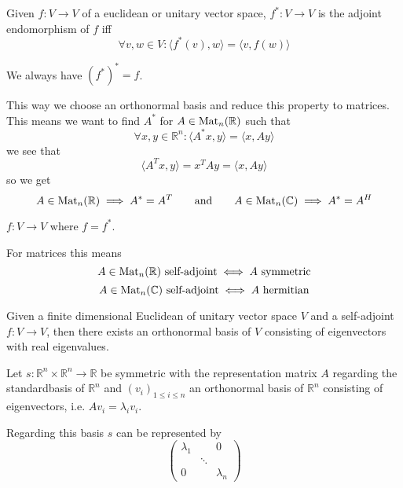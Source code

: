 \begin{definition}
   Given \(f: V \to V\) of a euclidean or unitary vector space, \(f^\ast: V \to V\) is the adjoint endomorphism of \(f\) iff
   \[\forall v, w \in V: \langle f^\ast(v), w\rangle = \langle v, f(w)\rangle\]
\end{definition}
\begin{remark}
   We always have \((f^\ast)^\ast = f\).
\end{remark}

This way we choose an orthonormal basis and reduce this property to matrices.
This means we want to find \(A^\ast\) for \(A \in \operatorname{Mat}_n(\mathbb{R})\) such that
\[\forall x, y \in \mathbb{R}^n: \langle A^\ast x, y\rangle = \langle x, Ay\rangle\]
we see that
\[\langle A^Tx, y \rangle = x^TAy = \langle x, Ay\rangle\]
so we get
\[A \in \operatorname{Mat}_n(\mathbb{R}) \implies A^\ast = A^T \qquad\text{and}\qquad A \in \operatorname{Mat}_n(\mathbb{C}) \implies A^\ast = A^H\]

\begin{definition}
   \(f: V \to V\) where \(f = f^\ast\).
\end{definition}
\begin{remark}
   For matrices this means
   \[A \in \operatorname{Mat}_n(\mathbb{R})~\text{self-adjoint} \iff A~\text{symmetric}\]
   \[A \in \operatorname{Mat}_n(\mathbb{C})~\text{self-adjoint} \iff A~\text{hermitian}\]
\end{remark}

\begin{proposition}\label{pro:spectral_thm}
   Given a finite dimensional Euclidean of unitary vector space \(V\) and a self-adjoint \(f: V \to V\), then there exists an orthonormal basis of \(V\) consisting of eigenvectors with real eigenvalues.
\end{proposition}

\begin{proposition}
   Let \(s: \mathbb{R}^n\times\mathbb{R}^n \to \mathbb{R}\) be symmetric with the representation matrix \(A\) regarding the standardbasis of \(\mathbb{R}^n\) and \((v_i)_{1 \leq i \leq n}\) an orthonormal basis of \(\mathbb{R}^n\) consisting of eigenvectors, i.e. \(A v_i = \lambda_i v_i\).

   Regarding this basis \(s\) can be represented by
   \[\begin{pmatrix}\lambda_1 & & 0\\ & \ddots & \\ 0 & & \lambda_n\end{pmatrix}\]
\end{proposition}

